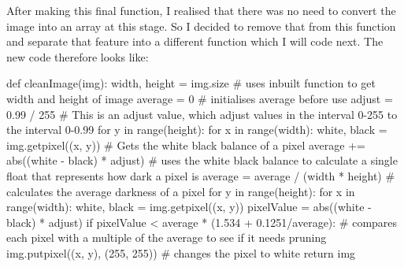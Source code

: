 \documentclass{report}
\begin{document}
After making this final function, I realised that there was no need to convert the image into an array at this stage. So I decided to remove that from this function and separate that feature into a different function which I will code next. The new code therefore looks like:
\begin{python}
def cleanImage(img):
    width, height = img.size  # uses inbuilt function to get width and height of image
    average = 0  # initialises average before use
    adjust = 0.99 / 255  # This is an adjust value, which adjust values in the interval 0-255 to the interval 0-0.99
    for y in range(height):
        for x in range(width):
            white, black = img.getpixel((x, y))  # Gets the white black balance of a pixel
            average += abs((white - black) * adjust)  # uses the white black balance to calculate a single float that represents how dark a pixel is
    average = average / (width * height) # calculates the average darkness of a pixel
    for y in range(height):
        for x in range(width):
            white, black = img.getpixel((x, y))
            pixelValue = abs((white - black) * adjust)
            if pixelValue < average * (1.534 + 0.1251/average):  # compares each pixel with a multiple of the average to see if it needs pruning
                img.putpixel((x, y), (255, 255))  # changes the pixel to white
    return img
\end{python}
\end{document}
